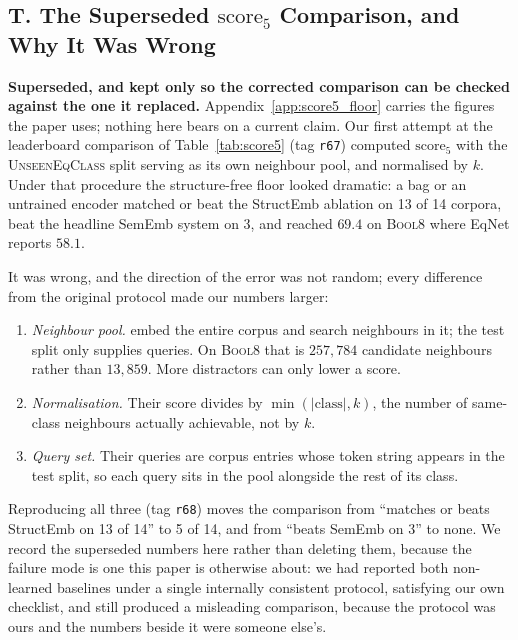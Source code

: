 \FloatBarrier
\subsection*{T. The Superseded $\mathrm{score}_5$ Comparison, and Why It Was Wrong}



\noindent\textbf{Superseded, and kept only so the corrected comparison can be checked against the one it replaced.} Appendix~\ref{app:score5_floor} carries the figures the paper uses; nothing here bears on a current claim.
Our first attempt at the leaderboard comparison of Table~\ref{tab:score5} (tag \texttt{r67})
computed $\mathrm{score}_5$ with the \textsc{UnseenEqClass} split serving as its own neighbour
pool, and normalised by $k$. Under that procedure the structure-free floor looked dramatic: a bag
or an untrained encoder matched or beat the StructEmb ablation on 13 of 14 corpora, beat the
headline SemEmb system on 3, and reached $69.4$ on \textsc{Bool8} where EqNet reports $58.1$.

It was wrong, and the direction of the error was not random; every difference from the original
protocol made our numbers larger:

\begin{enumerate}[noitemsep,topsep=2pt]
  \item \emph{Neighbour pool.} \citet{allamanis2017learning} embed the entire corpus and search
    neighbours in it; the test split only supplies queries. On \textsc{Bool8} that is $257{,}784$
    candidate neighbours rather than $13{,}859$. More distractors can only lower a score.
  \item \emph{Normalisation.} Their score divides by $\min(|\text{class}|, k)$, the number of
    same-class neighbours actually achievable, not by $k$.
  \item \emph{Query set.} Their queries are corpus entries whose token string appears in the test
    split, so each query sits in the pool alongside the rest of its class.
\end{enumerate}

Reproducing all three (tag \texttt{r68}) moves the comparison from ``matches or beats StructEmb on
13 of 14'' to 5 of 14, and from ``beats SemEmb on 3'' to none. We record the superseded numbers
here rather than deleting them, because the failure mode is one this paper is otherwise about: we
had reported both non-learned baselines under a single internally consistent protocol, satisfying
our own checklist, and still produced a misleading comparison, because the protocol was ours and
the numbers beside it were someone else's.

